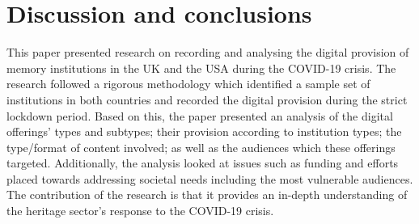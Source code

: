 \documentclass{egpubl}
\begin{document}








\section{Discussion and conclusions}
\label{disc}
This paper presented research on recording and analysing the digital provision of memory institutions in the UK and the USA during the COVID-19 crisis. The research followed a rigorous methodology which identified a sample set of institutions in both countries and recorded the digital provision during the strict lockdown period. Based on this, the paper presented an analysis of the digital offerings' types and subtypes; their provision according to institution types; the type/format of content involved; as well as the audiences which these offerings targeted. Additionally, the analysis looked at issues such as funding and efforts placed towards addressing societal needs including the most vulnerable audiences. The contribution of the research is that it provides an in-depth understanding of the heritage sector's response to the COVID-19 crisis.
\end{document}
